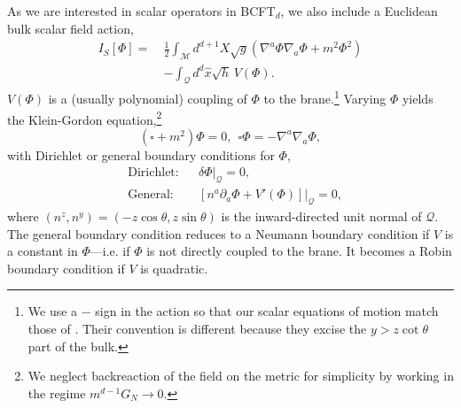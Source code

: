 \documentclass[reprint,amsmath,amssymb,aps,nofootinbib,twocolumn]{revtex4-2}
\newcommand{\jani}[1]{\textcolor{blue}{\textbf{??JK:} #1}}
\begin{document}
As we are interested in scalar operators in BCFT$_d$, we also include a Euclidean bulk scalar field action,
\begin{equation}
\begin{split}
I_S[\Phi] =\ &\frac{1}{2}\int_{\mathcal{M}} d^{d+1}X \sqrt{g} \left(\nabla^a \Phi \nabla_a \Phi + m^2 \Phi^2\right)\\
&- \int_{\mathcal{Q}} d^d \hat{x}\sqrt{h}\,V(\Phi).\label{scalarAct}
\end{split}
\end{equation}
$V(\Phi)$ is a (usually polynomial) coupling of $\Phi$ to the brane.\footnote{We use a $-$ sign in the action so that our scalar equations of motion match those of \cite{Takayanagi:2011zk,Fujita:2011fp}. Their convention is different because they excise the $y > z\cot\theta$ part of the bulk.} Varying $\Phi$ yields the Klein-Gordon equation,\footnote{We neglect backreaction of the field on the metric for simplicity by working in the regime $m^{d-1} G_N \to 0$.}
\begin{equation}
(\square + m^2)\Phi = 0,\ \ \square\Phi = -\nabla^a \nabla_a \Phi,\label{kgEq}
\end{equation}
with Dirichlet or general boundary conditions for $\Phi$,
\begin{align}
&\text{Dirichlet:} &&\delta\Phi|_{\mathcal{Q}} = 0,\\
&\text{General:} &&[n^a \partial_a \Phi + V'(\Phi)]|_{\mathcal{Q}} = 0,\label{gen}
\end{align}
where $(n^{z},n^{y}) = (-z\cos{\theta},z\sin{\theta})$ is the inward-directed unit normal of $\mathcal{Q}$. The general boundary condition reduces to a Neumann boundary condition if $V$ is a constant in $\Phi$---i.e. if $\Phi$ is not directly coupled to the brane. It becomes a Robin boundary condition if $V$ is quadratic.

\end{document}

